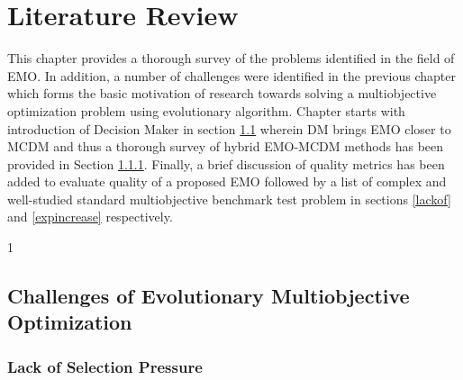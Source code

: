 
\chapter{Literature Review} %

\label{Chapter2} %



This chapter provides a thorough survey of the problems identified in the field of EMO. In addition, a number of challenges were identified in the previous chapter which forms the basic motivation of research towards solving a multiobjective optimization problem using evolutionary algorithm. Chapter starts with introduction of Decision Maker in section \ref{sec1} wherein DM brings EMO closer to MCDM and thus a thorough survey of hybrid EMO-MCDM methods has been provided in Section \ref{selection}. Finally, a brief discussion of quality metrics has been added to evaluate quality of a proposed EMO followed by a list of complex and well-studied standard multiobjective benchmark test problem in sections \ref{lackof} and \ref{expincrease} respectively. 





\begin{spacing}{1} 
    \section{Challenges of Evolutionary Multiobjective Optimization}\label{sec1}
\end{spacing}

\subsection{Lack of Selection Pressure}\label{selection}

